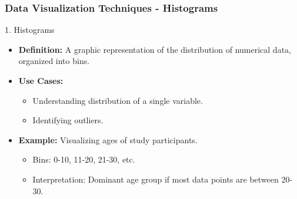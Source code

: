 \documentclass[aspectratio=169]{beamer}
\begin{document}
\begin{frame}[fragile]
    \frametitle{Data Visualization Techniques - Histograms}
    \begin{block}{1. Histograms}
        \begin{itemize}
            \item \textbf{Definition:} A graphic representation of the distribution of numerical data, organized into bins.
            \item \textbf{Use Cases:}
                \begin{itemize}
                    \item Understanding distribution of a single variable.
                    \item Identifying outliers.
                \end{itemize}
            \item \textbf{Example:} Visualizing ages of study participants.
                \begin{itemize}
                    \item Bins: 0-10, 11-20, 21-30, etc.
                    \item Interpretation: Dominant age group if most data points are between 20-30.
                \end{itemize}
        \end{itemize}
    \end{block}
\end{frame}
\end{document}

